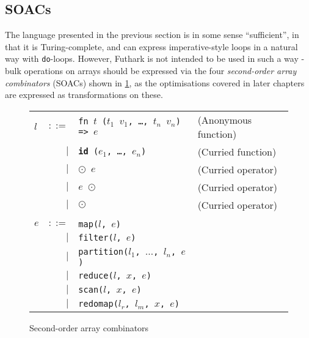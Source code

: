 \documentclass[oneside]{memoir}
\begin{document}
\subsection{SOACs}
\label{sec:soacs}

The language presented in the previous section is in some sense
``sufficient'', in that it is Turing-complete, and can express
imperative-style loops in a natural way with \texttt{do}-loops.
However, Futhark is not intended to be used in such a way - bulk
operations on arrays should be expressed via the four
\textit{second-order array combinators} (SOACs) shown in
\cref{fig:soacs}, as the optimisations covered in later chapters are
expressed as transformations on these.

\begin{figure}[bt]
\begin{tabular}{lrll}
$l$ & $::=$ & \texttt{fn $t$ ($t_{1}$ $v_{1}$, \ldots, $t_{n}$ $v_{n}$) => $e$} & (Anonymous function) \\
& $|$ & \texttt{\textbf{id} ($e_{1}$, \ldots, $e_{n}$)} & (Curried function) \\
& $|$ & \texttt{$\odot$ $e$} & (Curried operator) \\
& $|$ & \texttt{$e$ $\odot$} & (Curried operator) \\
& $|$ & \texttt{$\odot$}     & (Curried operator) \\
\\
$e$ & $::=$ & \texttt{map($l$, $e$)} \\
    & $|$ & \texttt{filter($l$, $e$)} \\
    & $|$ & \texttt{partition($l_{1}$, $\ldots$, $l_{n}$, $e$)} \\
    & $|$ & \texttt{reduce($l$, $x$, $e$)} \\
    & $|$ & \texttt{scan($l$, $x$, $e$)} \\
    & $|$ & \texttt{redomap($l_{r}$, $l_{m}$, $x$, $e$)} \\
\end{tabular}
\caption{Second-order array combinators}
\label{fig:soacs}
\end{figure}
\end{document}
